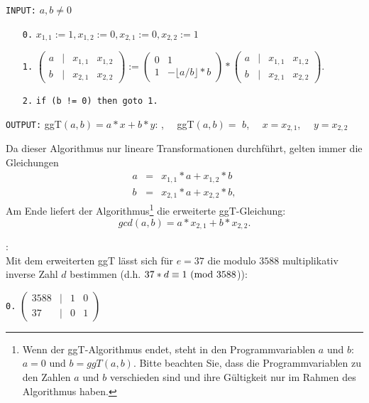 \begin{refsegment}
 {\tt INPUT:} $a,b \not= 0$
\begin{itemize}
  \item[\tt 0.] $x_{1,1} := 1, x_{1,2} := 0, x_{2,1} := 0, x_{2,2} := 1$
  \item[\tt 1.] $ \left(\begin{array}{cccc} a & | & x_{1,1} & x_{1,2} \\ b & | & x_{2,1} & x_{2,2} \end{array} \right) :=
           \left(\begin{array}{cc} 0 & 1  \\ 1 & - \lfloor a/b \rfloor * b \end{array} \right)*
           \left(\begin{array}{cccc} a & | & x_{1,1} & x_{1,2} \\ b & | & x_{2,1} & x_{2,2} \end{array} \right).$
  \item[\tt 2.] {\tt if (b != 0) then goto 1.}
\end{itemize}

{\tt OUTPUT:} \glqq ggT$(a,b) = a*x +b*y$: \grqq,~~ \glqq ggT$(a,b) =$ \grqq $b$,~~
                       \glqq $x = $\grqq $x_{2,1}$,~~ \glqq $y = $\grqq $x_{2,2}$

 Da dieser Algorithmus nur lineare Transformationen durchführt, gelten immer die Gleichungen
\begin{eqnarray*}
 a & = & x_{1,1}*a + x_{1,2}*b \nonumber\\
 b & = & x_{2,1}*a + x_{2,2}*b, \nonumber
\end{eqnarray*}
Am Ende liefert der Algorithmus\footnote{%
Wenn der ggT-Algorithmus endet, steht in den Programmvariablen $a$ und $b$:
$a = 0$ und $b=ggT(a,b)$. Bitte beachten Sie, dass die Programmvariablen zu den Zahlen
$a$ und $b$ verschieden sind und ihre Gültigkeit nur im Rahmen des Algorithmus haben.
} die erweiterte ggT-Gleichung:
$$gcd(a,b) = a*x_{2,1} + b*x_{2,2}.$$

\begin{example}{:}\\
Mit dem erweiterten ggT lässt sich für $e = 37$ die modulo $3588$ multiplikativ inverse Zahl
$d$ bestimmen (d.h. $37*d \equiv 1 {\rm ~(mod~} 3588$)):

{\tt 0.}
 $ \left(\begin{array}{cccc} 3588 & | & 1 & 0 \\ 37 & | & 0 & 1 \end{array} \right)$


\end{example}
\end{refsegment}
